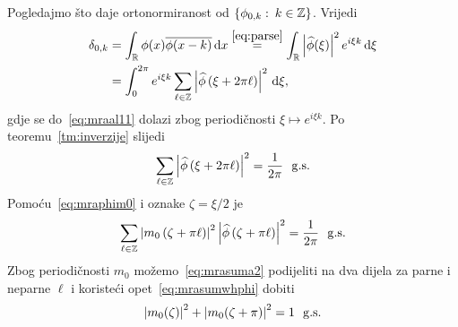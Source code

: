 \documentclass[main.tex]{subfiles}
\begin{document}
Pogledajmo što daje ortonormiranost od \( \left\{ \phi_{0,k} \, \colon \, k \in \mathbb{Z} \right\} \).
Vrijedi
\begin{align}
	\delta_{0,k} & = \int_{\mathbb{R}} \phi(x) \overline{\phi(x-k)} \,\mathrm d x
	\stackrel{\scriptstyle {\eqref{eq:parse}}}{=} \int_{\mathbb{R}} \left| {\widehat{\phi}(\xi)} \right|^2 e^{i\xi k} \,\mathrm d \xi                                                         \\
	             & = \int_0^{2\pi} e^{i \xi k} \sum_{\ell \in \mathbb{Z}} \left| {\widehat{\phi} \left( \xi + 2\pi\ell \right)} \right|^2 \,\mathrm d \xi, \label{eq:mraal11}
\end{align}
gdje se do~\eqref{eq:mraal11} dolazi zbog periodičnosti \( \xi \mapsto e^{i\xi k} \).
Po teoremu~\ref{tm:inverzije} slijedi
\begin{equation}\label{eq:mrasumwhphi}
	\sum_{\ell \in \mathbb{Z}} \left| {\widehat{\phi}\left( \xi + 2\pi\ell \right)} \right|^2 = \frac 1 {2\pi} \ \ \mathrm{g.s.}
\end{equation}
Pomoću~\eqref{eq:mraphim0} i oznake \( \zeta = \xi/2 \) je
\begin{equation}\label{eq:mrasuma2}
	\sum_{\ell \in \mathbb{Z}} \left| {m_0\left( \zeta + \pi\ell \right)} \right|^2
	\left| {\widehat{\phi} \left( \zeta + \pi\ell \right)} \right|^2 = \frac 1{2\pi} \ \ \mathrm{g.s.}
\end{equation}
Zbog periodičnosti \( m_0 \) možemo~\eqref{eq:mrasuma2} podijeliti
na dva dijela za parne i neparne \( \ell \) i koristeći opet~\eqref{eq:mrasumwhphi}
dobiti
\begin{equation}\label{eq:mram0sum1}
	\left| {m_0(\zeta)} \right|^2 + \left| {m_0(\zeta+\pi)} \right|^2 = 1 \ \ \mathrm{g.s.}
\end{equation}
\end{document}
